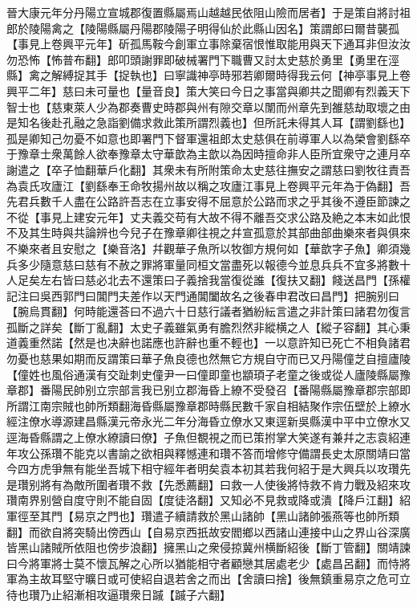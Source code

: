 晉大康元年分丹陽立宣城郡復置縣屬焉山越越民依阻山險而居者】于是策自將討祖郎於陵陽禽之【陵陽縣屬丹陽郡陵陽子明得仙於此縣山因名】策謂郎曰爾昔襲孤【事見上卷興平元年】斫孤馬鞍今創軍立事除棄宿恨惟取能用與天下通耳非但汝汝勿恐怖【怖普布翻】郎叩頭謝罪即破械署門下職曹又討太史慈於勇里【勇里在涇縣】禽之解縛捉其手【捉執也】曰寧識神亭時邪若卿爾時得我云何【神亭事見上卷興平二年】慈曰未可量也【量音良】策大笑曰今日之事當與卿共之聞卿有烈義天下智士也【慈東萊人少為郡奏曹史時郡與州有隙交章以闈而州章先到雒慈劫取壞之由是知名後赴孔融之急詣劉備求救此策所謂烈義也】但所託未得其人耳【謂劉繇也】孤是卿知己勿憂不如意也即署門下督軍還祖郎太史慈俱在前導軍人以為榮會劉繇卒于豫章士衆萬餘人欲奉豫章太守華歆為主歆以為因時擅命非人臣所宜衆守之連月卒謝遣之【卒子恤翻華戶化翻】其衆未有所附策命太史慈往撫安之謂慈曰劉牧往責吾為袁氏攻廬江【劉繇奉王命牧揚州故以稱之攻廬江事見上卷興平元年為于偽翻】吾先君兵數千人盡在公路許吾志在立事安得不屈意於公路而求之乎其後不遵臣節諫之不從【事見上建安元年】丈夫義交苟有大故不得不離吾交求公路及絶之本末如此恨不及其生時與共論辨也今兒子在豫章卿往視之幷宣孤意於其部曲部曲樂來者與俱來不樂來者且安慰之【樂音洛】幷觀華子魚所以牧御方規何如【華歆字子魚】卿須幾兵多少隨意慈曰慈有不赦之罪將軍量同桓文當盡死以報德今並息兵兵不宜多將數十人足矣左右皆曰慈必北去不還策曰子義捨我當復從誰【復扶又翻】餞送昌門【孫權記注曰吳西郭門曰閶門夫差作以天門通閶闔故名之後春申君改曰昌門】把腕别曰【腕烏貫翻】何時能還荅曰不過六十日慈行議者猶紛紜言遣之非計策曰諸君勿復言孤斷之詳矣【斷丁亂翻】太史子義雖氣勇有膽烈然非縱横之人【縱子容翻】其心秉道義重然諾【然是也决辭也諾應也許辭也重不輕也】一以意許知已死亡不相負諸君勿憂也慈果如期而反謂策曰華子魚良德也然無它方規自守而已又丹陽僮芝自擅廬陵【僮姓也風俗通漢有交趾刺史僮尹一曰僮即童也顓頊子老童之後或從人廬陵縣屬豫章郡】番陽民帥别立宗部言我已别立郡海昏上繚不受發召【番陽縣屬豫章郡宗部即所謂江南宗賊也帥所類翻海昏縣屬豫章郡時縣民數千家自相結聚作宗伍壁於上繚水經注僚水導源建昌縣漢元帝永光二年分海昏立僚水又東逕新吳縣漢中平中立僚水又逕海昏縣謂之上僚水繚讀曰僚】子魚但覩視之而已策拊掌大笑遂有兼幷之志袁紹連年攻公孫瓚不能克以書諭之欲相與釋憾連和瓚不答而增修守備謂長史太原關靖曰當今四方虎爭無有能坐吾城下相守經年者明矣袁本初其若我何紹于是大興兵以攻瓚先是瓚别將有為敵所圍者瓚不救【先悉薦翻】曰救一人使後將恃救不肯力戰及紹來攻瓚南界别營自度守則不能自固【度徒洛翻】又知必不見救或降或潰【降戶江翻】紹軍徑至其門【易京之門也】瓚遣子續請救於黑山諸帥【黑山諸帥張燕等也帥所類翻】而欲自將突騎出傍西山【自易京西扺故安閻鄉以西諸山連接中山之界山谷深廣皆黑山諸賊所依阻也傍步浪翻】擁黑山之衆侵掠冀州横斷紹後【斷丁管翻】關靖諫曰今將軍將士莫不懷瓦解之心所以猶能相守者顧戀其居處老少【處昌呂翻】而恃將軍為主故耳堅守曠日或可使紹自退若舍之而出【舍讀曰捨】後無鎮重易京之危可立待也瓚乃止紹漸相攻逼瓚衆日䠞【䠞子六翻】

